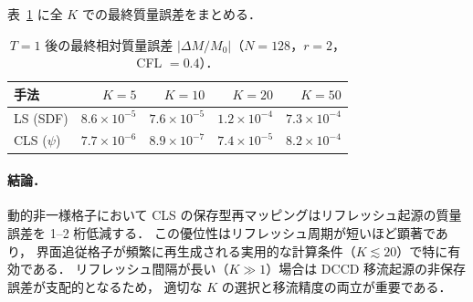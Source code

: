 表~\ref{tab:ls_cls_mass_err} に全 $K$ での最終質量誤差をまとめる．

\begin{table}[htbp]
  \centering
  \caption{%
    $T=1$ 後の最終相対質量誤差 $|\Delta M/M_0|$（$N=128$，$r=2$，CFL $=0.4$）．}
  \label{tab:ls_cls_mass_err}
  \begin{tabular}{lrrrr}
    \toprule
    手法 & $K=5$ & $K=10$ & $K=20$ & $K=50$ \\
    \midrule
    LS (SDF)     & $8.6\times10^{-5}$ & $7.6\times10^{-5}$ & $1.2\times10^{-4}$ & $7.3\times10^{-4}$ \\
    CLS ($\psi$) & $7.7\times10^{-6}$ & $8.9\times10^{-7}$ & $7.4\times10^{-5}$ & $8.2\times10^{-4}$ \\
    \bottomrule
  \end{tabular}
\end{table}

\paragraph{結論．}

動的非一様格子において CLS の保存型再マッピングはリフレッシュ起源の質量誤差を
1--2 桁低減する．
この優位性はリフレッシュ周期が短いほど顕著であり，
界面追従格子が頻繁に再生成される実用的な計算条件（$K \lesssim 20$）で特に有効である．
リフレッシュ間隔が長い（$K \gg 1$）場合は DCCD 移流起源の非保存誤差が支配的となるため，
適切な $K$ の選択と移流精度の両立が重要である．
